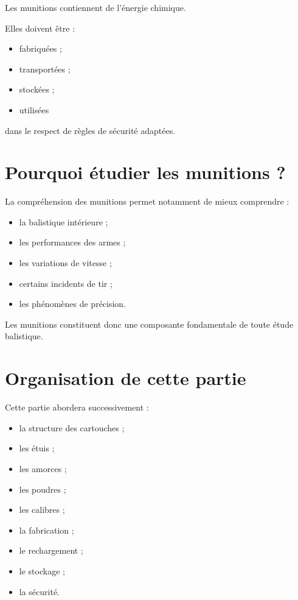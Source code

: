 Les munitions contiennent de l'énergie chimique.

Elles doivent être :

\begin{itemize}
    \item fabriquées ;
    \item transportées ;
    \item stockées ;
    \item utilisées
\end{itemize}

dans le respect de règles de sécurité adaptées.

\section{Pourquoi étudier les munitions ?}

La compréhension des munitions permet notamment de mieux comprendre :

\begin{itemize}
    \item la balistique intérieure ;
    \item les performances des armes ;
    \item les variations de vitesse ;
    \item certains incidents de tir ;
    \item les phénomènes de précision.
\end{itemize}

Les munitions constituent donc une composante fondamentale de toute étude
balistique.

\section{Organisation de cette partie}

Cette partie abordera successivement :

\begin{itemize}
    \item la structure des cartouches ;
    \item les étuis ;
    \item les amorces ;
    \item les poudres ;
    \item les calibres ;
    \item la fabrication ;
    \item le rechargement ;
    \item le stockage ;
    \item la sécurité.
\end{itemize}


